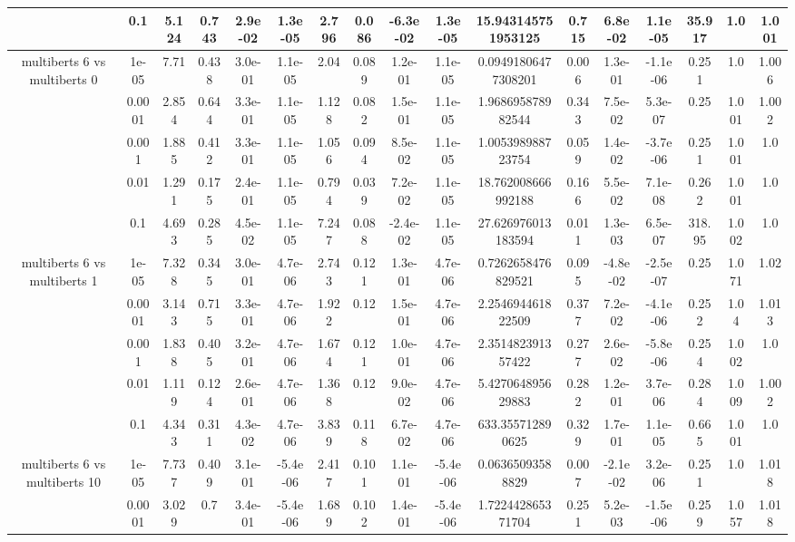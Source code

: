 \begin{tabular}{|c|c|c|c|c|c|c|c|c|c|c|c|c|c|c|c|c|}
 & 0.1 & 5.124 & 0.743 & 2.9e-02 & 1.3e-05 & 2.796 & 0.086 & -6.3e-02 & 1.3e-05 & 15.943145751953125 & 0.715 & 6.8e-02 & 1.1e-05 & 35.917 & 1.0 & 1.001 \\
\hline
\multirow{5}{*}{multiberts 6 vs multiberts 0} & 1e-05 & 7.71 & 0.438 & 3.0e-01 & 1.1e-05 & 2.04 & 0.089 & 1.2e-01 & 1.1e-05 & 0.09491806477308201 & 0.006 & 1.3e-01 & -1.1e-06 & 0.251 & 1.0 & 1.006 \\
 & 0.0001 & 2.854 & 0.644 & 3.3e-01 & 1.1e-05 & 1.128 & 0.082 & 1.5e-01 & 1.1e-05 & 1.968695878982544 & 0.343 & 7.5e-02 & 5.3e-07 & 0.25 & 1.001 & 1.002 \\
 & 0.001 & 1.885 & 0.412 & 3.3e-01 & 1.1e-05 & 1.056 & 0.094 & 8.5e-02 & 1.1e-05 & 1.005398988723754 & 0.059 & 1.4e-02 & -3.7e-06 & 0.251 & 1.001 & 1.0 \\
 & 0.01 & 1.291 & 0.175 & 2.4e-01 & 1.1e-05 & 0.794 & 0.039 & 7.2e-02 & 1.1e-05 & 18.762008666992188 & 0.166 & 5.5e-02 & 7.1e-08 & 0.262 & 1.001 & 1.0 \\
 & 0.1 & 4.693 & 0.285 & 4.5e-02 & 1.1e-05 & 7.247 & 0.088 & -2.4e-02 & 1.1e-05 & 27.626976013183594 & 0.011 & 1.3e-03 & 6.5e-07 & 318.95 & 1.002 & 1.0 \\
\hline
\multirow{5}{*}{multiberts 6 vs multiberts 1} & 1e-05 & 7.328 & 0.345 & 3.0e-01 & 4.7e-06 & 2.743 & 0.121 & 1.3e-01 & 4.7e-06 & 0.7262658476829521 & 0.095 & -4.8e-02 & -2.5e-07 & 0.25 & 1.071 & 1.02 \\
 & 0.0001 & 3.143 & 0.715 & 3.3e-01 & 4.7e-06 & 1.922 & 0.12 & 1.5e-01 & 4.7e-06 & 2.254694461822509 & 0.377 & 7.2e-02 & -4.1e-06 & 0.252 & 1.04 & 1.013 \\
 & 0.001 & 1.838 & 0.405 & 3.2e-01 & 4.7e-06 & 1.674 & 0.121 & 1.0e-01 & 4.7e-06 & 2.351482391357422 & 0.277 & 2.6e-02 & -5.8e-06 & 0.254 & 1.002 & 1.0 \\
 & 0.01 & 1.119 & 0.124 & 2.6e-01 & 4.7e-06 & 1.368 & 0.12 & 9.0e-02 & 4.7e-06 & 5.427064895629883 & 0.282 & 1.2e-01 & 3.7e-06 & 0.284 & 1.009 & 1.002 \\
 & 0.1 & 4.343 & 0.311 & 4.3e-02 & 4.7e-06 & 3.839 & 0.118 & 6.7e-02 & 4.7e-06 & 633.355712890625 & 0.329 & 1.7e-01 & 1.1e-05 & 0.665 & 1.001 & 1.0 \\
\hline
\multirow{5}{*}{multiberts 6 vs multiberts 10} & 1e-05 & 7.737 & 0.409 & 3.1e-01 & -5.4e-06 & 2.417 & 0.101 & 1.1e-01 & -5.4e-06 & 0.06365093588829 & 0.007 & -2.1e-02 & 3.2e-06 & 0.251 & 1.0 & 1.018 \\
 & 0.0001 & 3.029 & 0.7 & 3.4e-01 & -5.4e-06 & 1.689 & 0.102 & 1.4e-01 & -5.4e-06 & 1.722442865371704 & 0.251 & 5.2e-03 & -1.5e-06 & 0.259 & 1.057 & 1.018 \\

\end{tabular}
